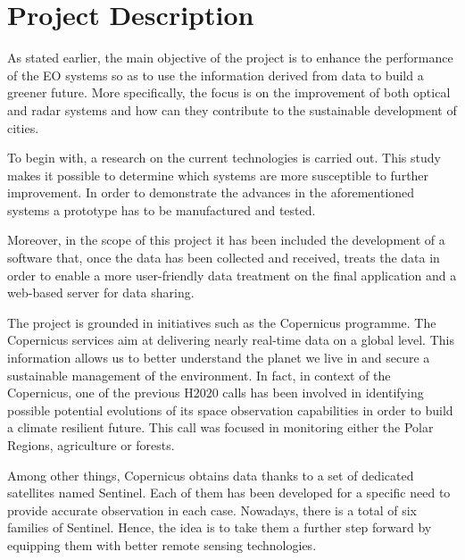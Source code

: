 \section{Project Description}
As stated earlier, the main objective of the project is to enhance the performance of the EO systems so as to use the information derived from data to build a greener future. More specifically, the focus is on the improvement of both optical and radar systems and how can they contribute to the sustainable development of cities. 

To begin with, a research on the current technologies is carried out. This study makes it possible to determine which systems are more susceptible to further improvement. In order to demonstrate the advances in the aforementioned systems a prototype has to be manufactured and tested. 

Moreover, in the scope of this project it has been included the development of a software that, once the data has been collected and received, treats the data in order to enable a more user-friendly data treatment on the final application and a web-based server for data sharing.

The project is grounded in initiatives such as the Copernicus programme. The Copernicus services aim at delivering nearly real-time data on a global level. This information allows us to better understand the planet we live in and secure a sustainable management of the environment. In fact, in context of the Copernicus, one of the previous H2020 calls has been involved in identifying possible potential evolutions of its space observation capabilities in order to build a climate resilient future. This call was focused in monitoring either the Polar Regions, agriculture or forests.

Among other things, Copernicus obtains data thanks to a set of dedicated satellites named Sentinel. Each of them has been developed for a specific need to provide accurate observation in each case. Nowadays, there is a total of six families of Sentinel. Hence, the idea is to take them a further step forward by equipping them with better remote sensing technologies. 
